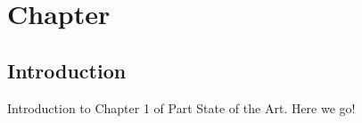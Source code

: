 \chapter{Chapter}
\label{sect:sota_chapter1}

\section{Introduction}

Introduction to Chapter 1 of Part State of the Art. Here we go!